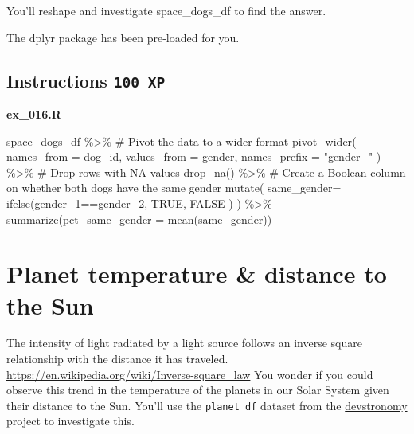 \documentclass[
  letterpaper,
  DIV=11,
  numbers=noendperiod]{scrreprt}
\newenvironment{Shaded}{\begin{snugshade}}{\end{snugshade}}
\newcommand{\AttributeTok}[1]{\textcolor[rgb]{0.40,0.45,0.13}{#1}}
\newcommand{\CommentTok}[1]{\textcolor[rgb]{0.37,0.37,0.37}{#1}}
\newcommand{\ConstantTok}[1]{\textcolor[rgb]{0.56,0.35,0.01}{#1}}
\newcommand{\FunctionTok}[1]{\textcolor[rgb]{0.28,0.35,0.67}{#1}}
\newcommand{\NormalTok}[1]{\textcolor[rgb]{0.00,0.23,0.31}{#1}}
\newcommand{\SpecialCharTok}[1]{\textcolor[rgb]{0.37,0.37,0.37}{#1}}
\newcommand{\StringTok}[1]{\textcolor[rgb]{0.13,0.47,0.30}{#1}}
\begin{document}
You'll reshape and investigate space\_dogs\_df to find the answer.

The dplyr package has been pre-loaded for you.

\hypertarget{instructions-100-xp-13}{%
\subsection*{\texorpdfstring{Instructions
\texttt{100\ XP}}{Instructions 100 XP}}\label{instructions-100-xp-13}}

\textbf{ex\_016.R}

\begin{Shaded}
\begin{Highlighting}[]
\NormalTok{space\_dogs\_df }\SpecialCharTok{\%\textgreater{}\%} 
  \CommentTok{\# Pivot the data to a wider format}
  \FunctionTok{pivot\_wider}\NormalTok{(}
    \AttributeTok{names\_from =}\NormalTok{ dog\_id,}
    \AttributeTok{values\_from =}\NormalTok{ gender,}
    \AttributeTok{names\_prefix =} \StringTok{"gender\_"}
\NormalTok{  ) }\SpecialCharTok{\%\textgreater{}\%} 
  \CommentTok{\# Drop rows with NA values}
  \FunctionTok{drop\_na}\NormalTok{() }\SpecialCharTok{\%\textgreater{}\%} 
  \CommentTok{\# Create a Boolean column on whether both dogs have the same gender}
  \FunctionTok{mutate}\NormalTok{(}
    \AttributeTok{same\_gender=} \FunctionTok{ifelse}\NormalTok{(gender\_1}\SpecialCharTok{==}\NormalTok{gender\_2,}
    \ConstantTok{TRUE}\NormalTok{,}
    \ConstantTok{FALSE}
\NormalTok{    )}
\NormalTok{  ) }\SpecialCharTok{\%\textgreater{}\%} 
  \FunctionTok{summarize}\NormalTok{(}\AttributeTok{pct\_same\_gender =} \FunctionTok{mean}\NormalTok{(same\_gender))}
\end{Highlighting}
\end{Shaded}

\hypertarget{planet-temperature-distance-to-the-sun}{%
\section{Planet temperature \& distance to the
Sun}\label{planet-temperature-distance-to-the-sun}}

The intensity of light radiated by a light source follows an inverse
square relationship with the distance it has traveled.
\url{https://en.wikipedia.org/wiki/Inverse-square_law} You wonder if you
could observe this trend in the temperature of the planets in our Solar
System given their distance to the Sun. You'll use the
\texttt{planet\_df} dataset from the
\href{https://devstronomy.com/\#/datasets}{devstronomy} project to
investigate this.
\end{document}
